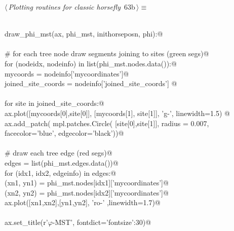 \documentclass[11.5pt]{report}
\begin{document}
\vspace{-0.8cm} \newchunk 

\begin{flushleft} \small\label{scrap91}\raggedright\small
{} $\langle\,${\itshape Plotting routines for classic horsefly}\nobreak\ {\footnotesize {63b}}$\,\rangle\equiv$
\vspace{-1ex}
\begin{list}{}{} \item
\mbox{}\verb@@\\
\mbox{}\verb@def draw_phi_mst(ax, phi_mst, inithorseposn, phi):@\\
\mbox{}\verb@@\\
\mbox{}\verb@     # for each tree node draw segments joining to sites (green segs)@\\
\mbox{}\verb@     for (nodeidx, nodeinfo) in list(phi_mst.nodes.data()):@\\
\mbox{}\verb@         mycoords           = nodeinfo['mycoordinates']@\\
\mbox{}\verb@         joined_site_coords = nodeinfo['joined_site_coords'] @\\
\mbox{}\verb@@\\
\mbox{}\verb@         for site in joined_site_coords:@\\
\mbox{}\verb@               ax.plot([mycoords[0],site[0]], [mycoords[1], site[1]], 'g-', linewidth=1.5) @\\
\mbox{}\verb@               ax.add_patch( mpl.patches.Circle( [site[0],site[1]], radius = 0.007, \@\\
\mbox{}\verb@                                                 facecolor='blue', edgecolor='black'))@\\
\mbox{}\verb@@\\
\mbox{}\verb@     # draw each tree edge (red segs)@\\
\mbox{}\verb@     edges = list(phi_mst.edges.data())@\\
\mbox{}\verb@     for (idx1, idx2, edgeinfo) in edges:@\\
\mbox{}\verb@          (xn1, yn1) =  phi_mst.nodes[idx1]['mycoordinates']@\\
\mbox{}\verb@          (xn2, yn2) =  phi_mst.nodes[idx2]['mycoordinates']@\\
\mbox{}\verb@          ax.plot([xn1,xn2],[yn1,yn2], 'ro-' ,linewidth=1.7)@\\
\mbox{}\verb@@\\
\mbox{}\verb@     ax.set_title(r'$\varphi$-MST', fontdict={'fontsize':30})@\\

\end{list}
\end{flushleft}
\end{document}
